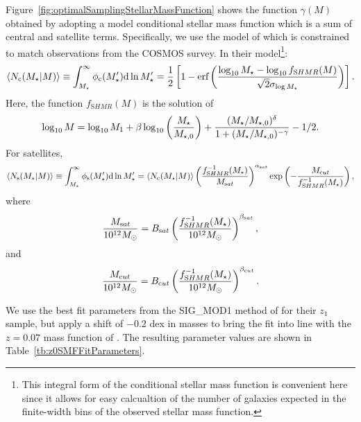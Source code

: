 Figure~\ref{fig:optimalSamplingStellarMassFunction} shows the function $\gamma(M)$ obtained by adopting a model conditional stellar mass function which is a sum of central and satellite terms. Specifically, we use the model of \cite{leauthaud_new_2011} which is constrained to match observations from the COSMOS survey. In their model\footnote{This integral form of the conditional stellar mass function is convenient here since it allows for easy calcualtion of the number of galaxies expected in the finite-width bins of the observed stellar mass function.}:
\begin{equation}
 \langle N_{\mathrm c}(M_\star|M)\rangle \equiv \int_{M_\star}^\infty \phi_{\mathrm c}(M_\star^\prime) \d \ln M_\star^\prime = {1 \over 2} \left[ 1 - \hbox{erf}\left( {\log_{10}M_\star - \log_{10} f_{\mathrm SHMR}(M) \over \sqrt{2}\sigma_{\log M_\star}} \right) \right].
\end{equation}
Here, the function $f_{\mathrm SHMR}(M)$ is the solution of
\begin{equation}
 \log_{10}M = \log_{10}M_1 + \beta \log_{10}\left({M_\star \over M_{\star,0}}\right) + {(M_\star/M_{\star,0})^\delta \over 1 + (M_\star/M_{\star,0})^{-\gamma}} - {1/2}.
\end{equation}
For satellites,
\begin{equation}
 \langle N_{\mathrm s}(M_\star|M)\rangle \equiv \int_{M_\star}^\infty \phi_{\mathrm s}(M_\star^\prime) \d \ln M_\star^\prime =  \langle N_{\mathrm c}(M_\star|M)\rangle \left({f^{-1}_{\mathrm SHMR}(M_\star) \over M_{\mathrm sat}}\right)^{\alpha_{\mathrm sat}} \exp\left(- {M_{\mathrm cut} \over f^{-1}_{\mathrm SHMR}(M_\star)} \right),
\end{equation}
where
\begin{equation}
 {M_{\mathrm sat} \over 10^{12} M_\odot} = B_{\mathrm sat} \left({f^{-1}_{\mathrm SHMR}(M_\star) \over 10^{12} M_\odot}\right)^{\beta_{\mathrm sat}},
\end{equation}
and
\begin{equation}
 {M_{\mathrm cut} \over 10^{12} M_\odot} = B_{\mathrm cut} \left({f^{-1}_{\mathrm SHMR}(M_\star) \over 10^{12} M_\odot}\right)^{\beta_{\mathrm cut}}.
\end{equation}

We use the best fit parameters from the {\normalfont \ttfamily SIG\_MOD1} method of \cite{leauthaud_new_2011} for their $z_1$ sample, but apply a shift of $-0.2$ dex in masses to bring the fit into line with the $z=0.07$ mass function of \cite{li_distribution_2009}. The resulting parameter values are shown in Table~\ref{tb:z0SMFFitParameters}.

